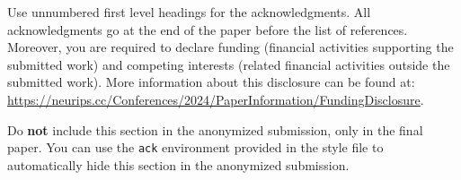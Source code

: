 \begin{ack}
Use unnumbered first level headings for the acknowledgments. All acknowledgments
go at the end of the paper before the list of references. Moreover, you are required to declare
funding (financial activities supporting the submitted work) and competing interests (related financial activities outside the submitted work).
More information about this disclosure can be found at: \url{https://neurips.cc/Conferences/2024/PaperInformation/FundingDisclosure}.


Do {\bf not} include this section in the anonymized submission, only in the final paper. You can use the \texttt{ack} environment provided in the style file to automatically hide this section in the anonymized submission.
\end{ack}